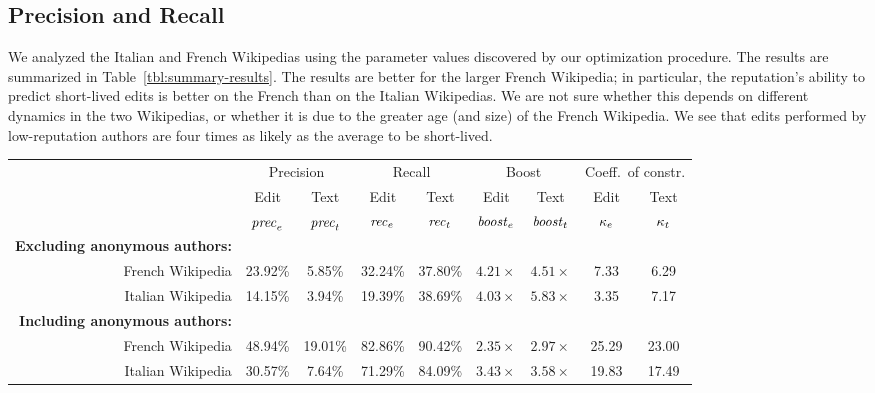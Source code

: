 \subsection{Precision and Recall}

We analyzed the Italian and French Wikipedias using the
parameter values discovered by our optimization procedure.
The results are summarized in Table~\ref{tbl:summary-results}. 
The results are better for the larger French Wikipedia; in particular,
the reputation's ability to predict short-lived edits is better on the
French than on the Italian Wikipedias. 
We are not sure whether this depends on different dynamics in the two
Wikipedias, or whether it is due to the greater age (and size) of the
French Wikipedia.
We see that edits performed by low-reputation authors are four times
as likely as the average to be short-lived. 

\begin{sidewaystable}[tp]
\begin{center}
\begin{tabular}{|r||c|c||c|c||c|c||c|c|} \hline
 & \multicolumn{2}{|c||}{Precision}
 & \multicolumn{2}{|c||}{Recall}
 & \multicolumn{2}{|c||}{Boost}
 & \multicolumn{2}{|c|}{Coeff.\ of constr.} \\
 & Edit & Text & Edit & Text  & Edit & Text & Edit & Text \\
 & ${\text{\textit{prec}}}_e$ & ${\text{\textit{prec}}}_t$ & ${\text{\textit{rec}}}_e$ & ${\text{\textit{rec}}}_t$ & ${\text{\textit{boost}}}_e$ & ${\text{\textit{boost}}}_t$ 
 & $\kappa_e$ & $\kappa_t$ \\[0.5ex] \hline 
\textbf{Excluding anonymous authors: \quad} & & & & & & & & \\
\qquad French Wikipedia          & 23.92\% &  5.85\% & 32.24\% & 37.80\% & $4.21\times$ & $4.51\times$ &  7.33 &  6.29 \\
\qquad Italian Wikipedia         & 14.15\% &  3.94\% & 19.39\% & 38.69\% & $4.03\times$ & $5.83\times$ &  3.35 &  7.17 \\ \hline
\textbf{Including anonymous authors: \quad} & & & & & & & & \\
\qquad French Wikipedia          & 48.94\% & 19.01\% & 82.86\% & 90.42\% & $2.35\times$ & $2.97\times$ & 25.29 & 23.00 \\
\qquad Italian Wikipedia         & 30.57\% &  7.64\% & 71.29\% & 84.09\% & $3.43\times$ & $3.58\times$ & 19.83 & 17.49 \\ \hline
\end{tabular}
\end{center}
\caption{Summary of the performance of content-driven reputation for
the Italian and French Wikipedias.}
\label{tbl:summary-results}
\end{sidewaystable}


